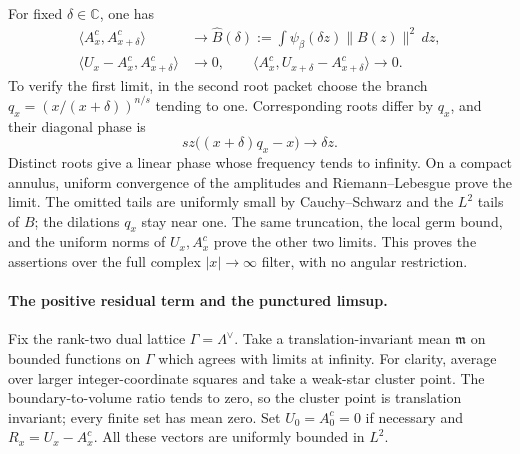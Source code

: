 For fixed $\delta\in\mathbb C$, one has
\begin{equation}\label{block-growth-packet-limit}
 \begin{split}
 \langle A^c_x,A^c_{x+\delta}\rangle
      &\longrightarrow\widehat B(\delta)
          :=\int\psi_\beta(\delta z)\|B(z)\|^2\,dz,\\
 \langle U_x-A^c_x,A^c_{x+\delta}\rangle&\longrightarrow0,
 \qquad
 \langle A^c_x,U_{x+\delta}-A^c_{x+\delta}\rangle
      \longrightarrow0.
 \end{split}
\end{equation}
To verify the first limit, in the second root packet choose
the branch $q_x=(x/(x+\delta))^{n/s}$ tending to one.  Corresponding
roots differ by $q_x$, and their diagonal phase is
\[
 sz\bigl((x+\delta)q_x-x\bigr)\longrightarrow\delta z.
\]
Distinct roots give a linear phase whose frequency tends to
infinity.  On a compact annulus, uniform convergence of the
amplitudes and Riemann--Lebesgue prove the limit.  The omitted
tails are uniformly small by Cauchy--Schwarz and the $L^2$ tails
of $B$; the dilations $q_x$ stay near one.  The same truncation,
the local germ bound, and the uniform norms of $U_x,A^c_x$ prove
the other two limits.  This proves the assertions over the full
complex $|x|\to\infty$ filter, with no angular restriction.

\paragraph{The positive residual term and the punctured limsup.}
Fix the rank-two dual lattice $\Gamma=\Lambda^\vee$.
Take a translation-invariant mean $\mathfrak m$ on bounded
functions on $\Gamma$ which agrees with limits at infinity.
For clarity, average over larger integer-coordinate squares
and take a weak-star cluster point.  The boundary-to-volume
ratio tends to zero, so the cluster point is translation
invariant; every finite set has mean zero.  Set $U_0=A^c_0=0$
if necessary and $R_x=U_x-A^c_x$.  All these vectors are uniformly
bounded in $L^2$.


